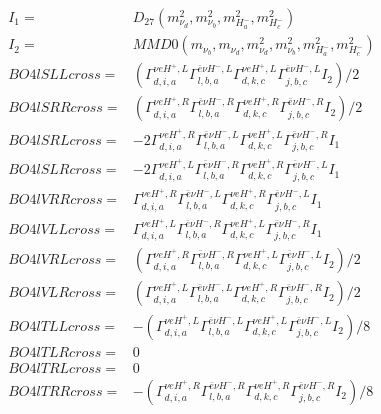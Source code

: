 \documentclass[A4,landscape]{article}
\begin{document}
\begin{align} 
I_1 = & D_{27}(m^2_{\nu_{{d}}}, m^2_{\nu_{{b}}}, m^2_{H^-_{{a}}}, m^2_{H^-_{{c}}}) \\ 
I_2 = & MMD0(m_{\nu_{{b}}}, m_{\nu_{{d}}}, m^2_{\nu_{{d}}}, m^2_{\nu_{{b}}}, m^2_{H^-_{{a}}}, m^2_{H^-_{{c}}}) \\ 
  BO4lSLLcross= & ( \Gamma^{\nu e H^+,L}_{d, i, a} \Gamma^{\bar{e}\nu H^- ,L}_{l, b, a} \Gamma^{\nu e H^+,L}_{d, k, c} \Gamma^{\bar{e}\nu H^- ,L}_{j, b, c} I_2)/2 \\ 
  BO4lSRRcross= & ( \Gamma^{\nu e H^+,R}_{d, i, a} \Gamma^{\bar{e}\nu H^- ,R}_{l, b, a} \Gamma^{\nu e H^+,R}_{d, k, c} \Gamma^{\bar{e}\nu H^- ,R}_{j, b, c} I_2)/2 \\ 
  BO4lSRLcross= & -2  \Gamma^{\nu e H^+,R}_{d, i, a} \Gamma^{\bar{e}\nu H^- ,L}_{l, b, a} \Gamma^{\nu e H^+,L}_{d, k, c} \Gamma^{\bar{e}\nu H^- ,R}_{j, b, c} I_1 \\ 
  BO4lSLRcross= & -2  \Gamma^{\nu e H^+,L}_{d, i, a} \Gamma^{\bar{e}\nu H^- ,R}_{l, b, a} \Gamma^{\nu e H^+,R}_{d, k, c} \Gamma^{\bar{e}\nu H^- ,L}_{j, b, c} I_1 \\ 
  BO4lVRRcross= &  \Gamma^{\nu e H^+,R}_{d, i, a} \Gamma^{\bar{e}\nu H^- ,L}_{l, b, a} \Gamma^{\nu e H^+,R}_{d, k, c} \Gamma^{\bar{e}\nu H^- ,L}_{j, b, c} I_1 \\ 
  BO4lVLLcross= &  \Gamma^{\nu e H^+,L}_{d, i, a} \Gamma^{\bar{e}\nu H^- ,R}_{l, b, a} \Gamma^{\nu e H^+,L}_{d, k, c} \Gamma^{\bar{e}\nu H^- ,R}_{j, b, c} I_1 \\ 
  BO4lVRLcross= & ( \Gamma^{\nu e H^+,R}_{d, i, a} \Gamma^{\bar{e}\nu H^- ,R}_{l, b, a} \Gamma^{\nu e H^+,L}_{d, k, c} \Gamma^{\bar{e}\nu H^- ,L}_{j, b, c} I_2)/2 \\ 
  BO4lVLRcross= & ( \Gamma^{\nu e H^+,L}_{d, i, a} \Gamma^{\bar{e}\nu H^- ,L}_{l, b, a} \Gamma^{\nu e H^+,R}_{d, k, c} \Gamma^{\bar{e}\nu H^- ,R}_{j, b, c} I_2)/2 \\ 
  BO4lTLLcross= & -( \Gamma^{\nu e H^+,L}_{d, i, a} \Gamma^{\bar{e}\nu H^- ,L}_{l, b, a} \Gamma^{\nu e H^+,L}_{d, k, c} \Gamma^{\bar{e}\nu H^- ,L}_{j, b, c} I_2)/8 \\ 
  BO4lTLRcross= & 0 \\ 
  BO4lTRLcross= & 0 \\ 
  BO4lTRRcross= & -( \Gamma^{\nu e H^+,R}_{d, i, a} \Gamma^{\bar{e}\nu H^- ,R}_{l, b, a} \Gamma^{\nu e H^+,R}_{d, k, c} \Gamma^{\bar{e}\nu H^- ,R}_{j, b, c} I_2)/8 \\ 
\end{align} 
\end{document}

